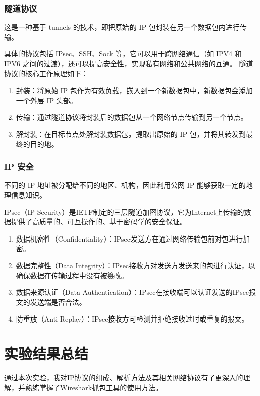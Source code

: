 \documentclass[14pt,a4paper,UTF8,twoside]{article}
\begin{document}
\subsubsection{隧道协议}

这是一种基于 tunnels 的技术，即把原始的 IP 包封装在另一个数据包内进行传输。

具体的协议包括 IPsec、SSH、Sock 等，它可以用于跨网络通信（如 IPV4 和 IPV6 之间的过渡），还可以提高安全性，实现私有网络和公共网络的互通。
隧道协议的核心工作原理如下：

\begin{enumerate}
  \item 封装：将原始 IP 包作为有效负载，嵌入到一个新数据包中，新数据包会添加一个外层 IP 头部。
  \item 传输：通过隧道协议将封装后的数据包从一个网络节点传输到另一个节点。
  \item 解封装：在目标节点处解封装数据包，提取出原始的 IP 包，并将其转发到最终的目的地。
\end{enumerate}


\subsubsection{IP 安全}

不同的 IP 地址被分配给不同的地区、机构，因此利用公网 IP 能够获取一定的地
理信息知识。

IPsec（IP Security）是IETF制定的三层隧道加密协议，它为Internet上传输的数据提供了高质量的、可互操作的、基于密码学的安全保证。

\begin{enumerate}
  \item 数据机密性（Confidentiality）：IPsec发送方在通过网络传输包前对包进行加密。
  \item 数据完整性（Data Integrity）：IPsec接收方对发送方发送来的包进行认证，以确保数据在传输过程中没有被篡改。
  \item 数据来源认证（Data Authentication）：IPsec在接收端可以认证发送的IPsec报文的发送端是否合法。
  \item 防重放（Anti-Replay）：IPsec接收方可检测并拒绝接收过时或重复的报文。
\end{enumerate}

\section{实验结果总结}

通过本次实验，我对IP协议的组成、解析方法及其相关网络协议有了更深入的理解，并熟练掌握了Wireshark抓包工具的使用方法。
\end{document}
